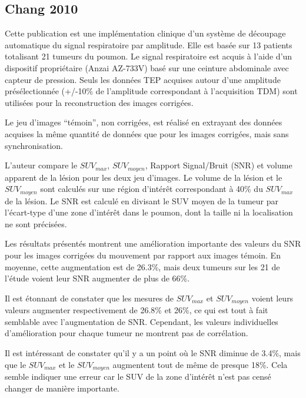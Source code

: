 \subsection{Chang 2010}

Cette publication est une implémentation clinique d'un système de découpage automatique du signal respiratoire par amplitude. Elle est basée sur 13 patients totalisant 21 tumeurs du poumon. Le signal respiratoire est acquis à l'aide d'un dispositif propriétaire (Anzai AZ-733V) basé sur une ceinture abdominale avec capteur de pression. Seuls les données TEP acquises autour d'une amplitude présélectionnée (+/-10\% de l'amplitude correspondant à l'acquisition TDM) sont utilisées pour la reconstruction des images corrigées. 

Le jeu d'images ``témoin'', non corrigées, est réalisé en extrayant des données acquises la même quantité de données que pour les images corrigées, mais sans synchronisation.

L'auteur compare le $SUV_{max}$, $SUV_{moyen}$, Rapport Signal/Bruit (SNR) et volume apparent de la lésion pour les deux jeu d'images. Le volume de la lésion et le $SUV _{moyen}$ sont calculés sur une région d'intérêt correspondant à 40\% du $SUV_{max}$ de la lésion. Le SNR est calculé en divisant le SUV moyen de la tumeur par l'écart-type d'une zone d'intérêt dans le poumon, dont la taille ni la localisation ne sont précisées. 

Les résultats présentés montrent une amélioration importante des valeurs du SNR pour les images corrigées du mouvement par rapport aux images témoin. En moyenne, cette augmentation est de 26.3\%, mais deux tumeurs sur les 21 de l'étude voient leur SNR augmenter de plus de 66\%. 

Il est étonnant de constater que les mesures de $SUV_{max}$ et $SUV_{moyen}$ voient leurs valeurs augmenter respectivement de 26.8\% et 26\%, ce qui est tout à fait semblable avec l'augmentation de SNR. Cependant, les valeurs individuelles d'amélioration  pour chaque tumeur ne montrent pas de corrélation.

Il est intéressant de constater qu'il y a un point où le SNR diminue de 3.4\%, mais que le $SUV_{max}$ et le $SUV_{moyen}$ augmentent tout de même de presque 18\%. Cela semble indiquer une erreur car le SUV de la zone d'intérêt n'est pas censé changer de manière importante.
